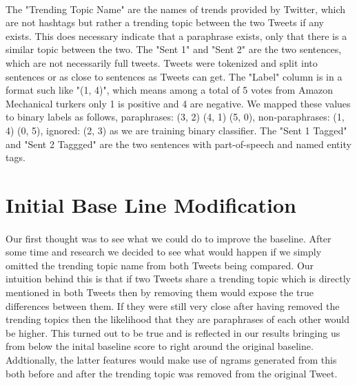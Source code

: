 \documentclass[11pt,letterpaper]{article}
\begin{document}
\paragraph{}
The "Trending Topic Name" are the names of trends provided by Twitter, which are not hashtags but rather a trending topic between the two Tweets if any exists. This does necessary indicate that a paraphrase exists, only that there is a similar topic between the two. 
The "Sent 1" and "Sent 2" are the two sentences, which are not necessarily full tweets. Tweets were tokenized and split into sentences or as close to sentences as Tweets can get.
The "Label" column is in a format such like "(1, 4)", which means among a total of 5 votes 
from Amazon Mechanical turkers only 1 is positive and 4 are negative. We mapped these values to binary labels as follows,
paraphrases: (3, 2) (4, 1) (5, 0), non-paraphrases: (1, 4) (0, 5), ignored: (2, 3) as we are training binary classifier.
The "Sent 1 Tagged" and "Sent 2 Taggged" are the two sentences with part-of-speech and named entity tags. 

\paragraph{}

\section{Initial Base Line Modification}
\paragraph{}
Our first thought was to see what we could do to improve the baseline. After some time and research we decided to see what would happen if we simply omitted the trending topic name from both Tweets being compared. Our intuition behind this is that if two Tweets share a trending topic which is directly mentioned in both Tweets then by removing them would expose the true differences between them. If they were still very close after having removed the trending topics then the likelihood that they are paraphrases of each other would be higher. This turned out to be true and is reflected in our results bringing us from below the inital baseline score to right around the original baseline. Addtionally, the latter features would make use of ngrams generated from this both before and after the trending topic was removed from the original Tweet.
\end{document}
